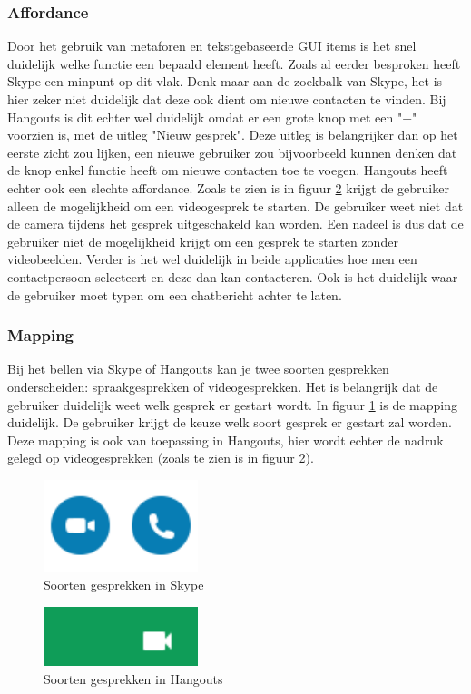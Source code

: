 \documentclass[11pt]{article}
\begin{document}
\subsubsection{Affordance}
Door het gebruik van metaforen en tekstgebaseerde GUI items is het snel duidelijk welke functie een bepaald element heeft. Zoals al eerder besproken heeft Skype een minpunt op dit vlak. Denk maar aan de zoekbalk van Skype, het is hier zeker niet duidelijk dat deze ook dient om nieuwe contacten te vinden. Bij Hangouts is dit echter wel duidelijk omdat er een grote knop met een "+" voorzien is, met de uitleg "Nieuw gesprek". Deze uitleg is belangrijker dan op het eerste zicht zou lijken, een nieuwe gebruiker zou bijvoorbeeld kunnen denken dat de knop enkel functie heeft om nieuwe contacten toe te voegen. 
\newline
Hangouts heeft echter ook een slechte affordance. Zoals te zien is in figuur \ref{fig:SoortHangouts} krijgt de gebruiker alleen de mogelijkheid om een videogesprek te starten. De gebruiker weet niet dat de camera tijdens het gesprek uitgeschakeld kan worden. Een nadeel is dus dat de gebruiker niet de mogelijkheid krijgt om een gesprek te starten zonder videobeelden.
\newline
 Verder is het wel duidelijk in beide applicaties hoe men een contactpersoon selecteert en deze dan kan contacteren. Ook is het duidelijk waar de gebruiker moet typen om een chatbericht achter te laten. 
 \subsubsection{Mapping}
 Bij het bellen via Skype of Hangouts kan je twee soorten gesprekken onderscheiden: spraakgesprekken of videogesprekken. Het is belangrijk dat de gebruiker duidelijk weet welk gesprek er gestart wordt. In figuur \ref{fig:SoortSkype} is de mapping duidelijk. De gebruiker krijgt de keuze welk soort gesprek er gestart zal worden. Deze mapping is ook van toepassing in Hangouts, hier wordt echter de nadruk gelegd op videogesprekken (zoals te zien is in figuur \ref{fig:SoortHangouts}).
 \begin{figure}
	\centering
	\includegraphics[width=0.4\textwidth]{Bram_ScreenshotSkype3.png}
	\caption{Soorten gesprekken in Skype}
	\label{fig:SoortSkype}
\end{figure}
\begin{figure}
	\centering
	\includegraphics[width=0.4\textwidth]{Bram_ScreenshotGH3.png}
	\caption{Soorten gesprekken in Hangouts}
	\label{fig:SoortHangouts}
\end{figure}
\end{document}

